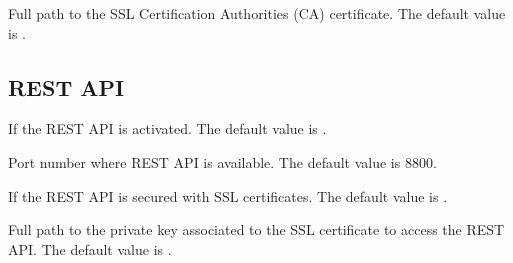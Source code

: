 \documentclass[letterpaper,10pt,english]{sphinxmanual}
\begin{document}

\begin{fulllineitems}
\label{manual:confval-XMLRCP_SSL_CA_CERTS}
Full path to the SSL Certification Authorities (CA) certificate.
The default value is .

\end{fulllineitems}



\subsection{REST API}
\label{manual:rest-api}\label{manual:options-rest}

\begin{fulllineitems}
\label{manual:confval-ACTIVATE_REST}
If  the REST API is activated.
The default value is .

\end{fulllineitems}


\begin{fulllineitems}
\label{manual:confval-REST_PORT}
Port number where REST API is available.
The default value is 8800.

\end{fulllineitems}


\begin{fulllineitems}
\label{manual:confval-REST_SSL}
If  the REST API is secured with SSL certificates.
The default value is .

\end{fulllineitems}


\begin{fulllineitems}
\label{manual:confval-REST_SSL_KEYFILE}
Full path to the private key associated to the SSL certificate to access
the REST API.
The default value is .

\end{fulllineitems}
\end{document}
